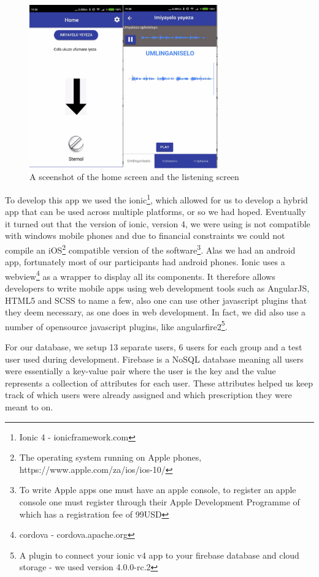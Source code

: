 \begin{figure}
\includegraphics[width=\linewidth, height=200pt]{mobileapp}
\caption{A sceenshot of the home screen and the listening screen}
\end{figure}

To develop this app we used the ionic\footnote{Ionic 4 - ionicframework.com}, which allowed for us to develop a hybrid app that can be used across multiple platforms, or so we had hoped. Eventually it turned out that the version of ionic, version 4, we were using is not compatible with windows mobile phones and
due to financial constraints we could not compile an iOS\footnote{The operating system running on Apple phones, https://www.apple.com/za/ios/ios-10/} compatible version of the software\footnote{To write Apple apps one must have an apple console, to register an apple console one must register through their Apple Development Programme of which has a registration fee of 99USD}. Alas we had an android app, fortunately most of our participants had android phones. Ionic uses a webview\footnote{cordova - cordova.apache.org} as a wrapper to display all its components. It therefore allows developers to write mobile apps using web development tools such as AngularJS, HTML5 and SCSS to name a few, also one can use other javascript plugins that they deem necessary, as one does in web development. In fact, we did also use a number of opensource javascript plugins, like angularfire2\footnote{A plugin to connect your ionic v4 app to your firebase database and cloud storage - we used version 4.0.0-rc.2}.

For our database, we setup 13 separate users, 6 users for each group and a test user used during development. Firebase is a NoSQL database meaning all users were essentially a key-value pair where the user is the key and the value represents a collection of attributes for each user. These attributes helped us keep track of which users were already assigned and which prescription they were meant to on.

